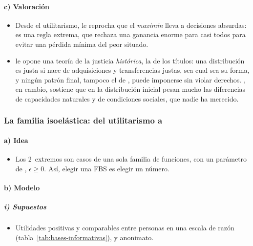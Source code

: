 \documentclass[11pt]{article}
\begin{document}
\paragraph{c) Valoración}

\begin{itemize}
\item Desde el utilitarismo, \textcite[595--597]{Harsanyi1975Maximin} le reprocha que el \emph{maximin} lleva a decisiones absurdas: es una regla extrema, que rechaza una ganancia enorme para casi todos para evitar una pérdida mínima del peor situado.
\item \textcite{Nozick1974Anarchy} le opone una teoría de la justicia \emph{histórica}, la de los títulos: una distribución es justa si nace de adquisiciones y transferencias justas, sea cual sea su forma, y ningún patrón final, tampoco el de , puede imponerse sin violar derechos. , en cambio, sostiene que en la distribución inicial pesan mucho las diferencias de capacidades naturales y de condiciones sociales, que nadie ha merecido.
\end{itemize}

\subsubsection{La familia isoelástica: del utilitarismo a }\label{sec:isoelastica}

\paragraph{a) Idea}

\begin{itemize}
\item Los 2~extremos son casos de una sola familia de funciones, con un parámetro de , $\epsilon\geq0$\nocite{Atkinson1970Measurement}. Así, elegir una FBS es elegir un número.
\end{itemize}

\paragraph{b) Modelo}

\subparagraph{i) Supuestos}

\begin{itemize}
\item Utilidades positivas y comparables entre personas en una escala de razón (tabla~\ref{tab:bases-informativas}), y anonimato.
\end{itemize}
\end{document}
